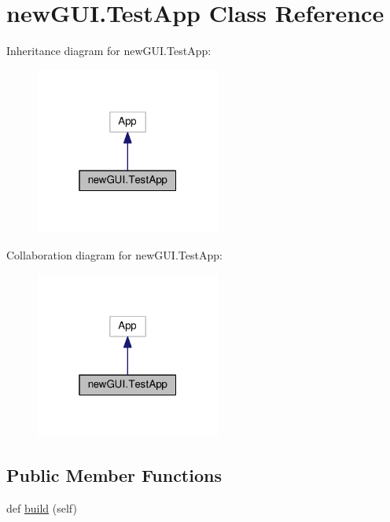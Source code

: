 \hypertarget{classnewGUI_1_1TestApp}{}\section{new\+G\+U\+I.\+Test\+App Class Reference}
\label{classnewGUI_1_1TestApp}


Inheritance diagram for new\+G\+U\+I.\+Test\+App\+:\nopagebreak
\begin{figure}[H]
\begin{center}
\leavevmode
\includegraphics[width=172pt]{classnewGUI_1_1TestApp__inherit__graph}
\end{center}
\end{figure}


Collaboration diagram for new\+G\+U\+I.\+Test\+App\+:\nopagebreak
\begin{figure}[H]
\begin{center}
\leavevmode
\includegraphics[width=172pt]{classnewGUI_1_1TestApp__coll__graph}
\end{center}
\end{figure}
\subsection*{Public Member Functions}
\begin{DoxyCompactItemize}
\item 
def \hyperlink{classnewGUI_1_1TestApp_a4d94c14d0aaeaa5ef1a931bd44fd9800}{build} (self)
\end{DoxyCompactItemize}
